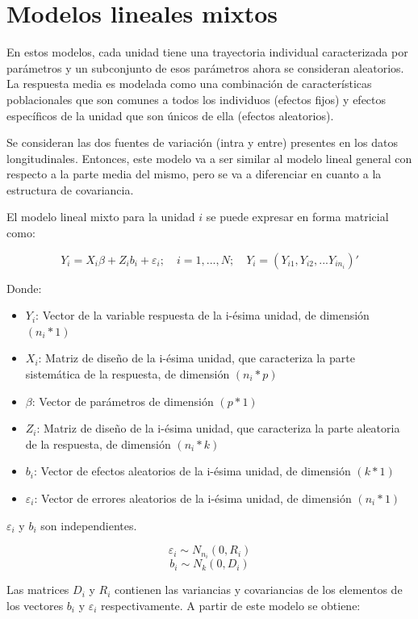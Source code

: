 \documentclass[spanish]{article}
\numberwithin{figure}{subsection}
\numberwithin{equation}{subsection}
\numberwithin{table}{subsection}
\begin{document}
\section{Modelos lineales mixtos}

En estos modelos, cada unidad tiene una trayectoria individual caracterizada
por parámetros y un subconjunto de esos parámetros ahora se consideran
aleatorios. La respuesta media es modelada como una combinación de
características poblacionales que son comunes a todos los individuos (efectos
fijos) y efectos específicos de la unidad que son únicos de ella (efectos
aleatorios).

Se consideran las dos fuentes de variación (intra y entre) presentes en los
datos longitudinales. Entonces, este modelo va a ser similar al modelo lineal
general con respecto a la parte media del mismo, pero se va a diferenciar en
cuanto a la estructura de covariancia.

El modelo lineal mixto para la unidad $i$ se puede expresar en forma matricial
como:

\[ Y_i = X_i\beta + Z_ib_i + \varepsilon_i; \quad i = 1, ..., N;
\quad Y_i = (Y_{i1}, Y_{i2}, ... Y_{in_{i}})' \]

Donde:

\begin{itemize}
	\item $Y_i$: Vector de la variable respuesta de la i-ésima unidad, de
	dimensión $(n_i*1)$
	\item $X_i$: Matriz de diseño de la i-ésima unidad, que caracteriza la
	parte sistemática de la respuesta, de dimensión $(n_i*p)$
	\item $\beta$: Vector de parámetros de dimensión $(p*1)$
	\item $Z_i$: Matriz de diseño de la i-ésima unidad, que caracteriza la
	parte aleatoria de la respuesta, de dimensión $(n_i*k)$
	\item $b_i$: Vector de efectos aleatorios de la i-ésima unidad, de
	dimensión $(k*1)$
	\item $\varepsilon_i$: Vector de errores aleatorios de la i-ésima unidad,
	de dimensión $(n_i*1)$
\end{itemize}

$\varepsilon_i$ y $b_i$ son independientes.

\[ \varepsilon_i \sim N_{n_i}(0, R_i) \]
\[ b_i \sim N_k(0, D_i) \]

Las matrices $D_i$ y $R_i$ contienen las variancias y covariancias de los
elementos de los vectores $b_i$ y $\varepsilon_i$ respectivamente. A partir de
este modelo se obtiene:
\end{document}
